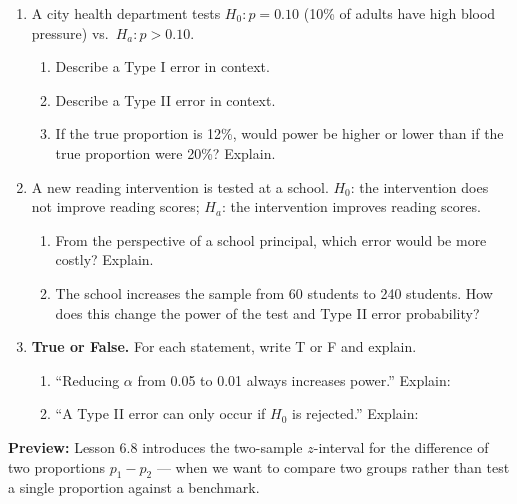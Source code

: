 \documentclass[10pt]{article}
\begin{document}
\namedateperiod

\vspace{0.15in}

\begin{enumerate}

  \item A city health department tests $H_0: p = 0.10$ (10\% of adults have high blood
        pressure) vs.\ $H_a: p > 0.10$.
        \begin{enumerate}[label=\alph*.]
          \item Describe a Type I error in context. 
          \item Describe a Type II error in context. 
          \item If the true proportion is 12\%, would power be higher or lower than if
                the true proportion were 20\%? Explain. 
        \end{enumerate}

  \item A new reading intervention is tested at a school. $H_0$: the intervention does not
        improve reading scores; $H_a$: the intervention improves reading scores.
        \begin{enumerate}[label=\alph*.]
          \item From the perspective of a school principal, which error would be more
                costly? Explain. 
          \item The school increases the sample from 60 students to 240 students. How
                does this change the power of the test and Type II error probability? 
        \end{enumerate}

  \item \textbf{True or False.} For each statement, write T or F and explain.
        \begin{enumerate}[label=\alph*.]
          \item ``Reducing $\alpha$ from 0.05 to 0.01 always increases power.''
                \blank{1cm} Explain: 
          \item ``A Type II error can only occur if $H_0$ is rejected.''
                \blank{1cm} Explain: 
        \end{enumerate}

\end{enumerate}

\begin{reflectionbox}
\textbf{Preview:} Lesson 6.8 introduces the two-sample $z$-interval for the difference
of two proportions $p_1 - p_2$ --- when we want to compare two groups rather than test
a single proportion against a benchmark.
\end{reflectionbox}
\end{document}
